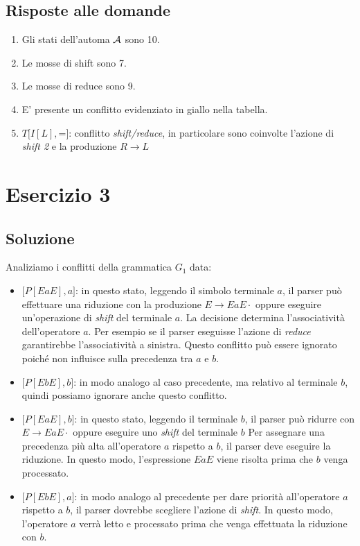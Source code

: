 \documentclass[11pt]{article}
\begin{document}
\subsection{Risposte alle domande}

\begin{enumerate}
  \item Gli stati dell'automa $\cal A$ sono 10.
  \item Le mosse di shift sono 7.
  \item Le mosse di reduce sono 9.
  \item E' presente un conflitto evidenziato in giallo nella tabella.
  \item $T\big[I[L], $=$\big]$: conflitto \textit{shift/reduce}, in particolare 
  sono coinvolte l'azione di \textit{shift 2} e la produzione $R\rightarrow L$
\end{enumerate}


\section{Esercizio 3}
\subsection{Soluzione}
Analiziamo i conflitti della grammatica $G_1$ data:
\begin{itemize}
  \item $\big[P[EaE], a\big]$: in questo stato, leggendo il simbolo terminale $a$, il parser può
effettuare una riduzione con la produzione $E \rightarrow EaE\cdot$ oppure eseguire 
un'operazione di \textit{shift} del terminale $a$.
La decisione determina l'associatività dell'operatore $a$. Per esempio se il parser 
eseguisse l'azione di \textit{reduce} garantirebbe l'associatività a sinistra. Questo 
conflitto può essere ignorato poiché non influisce sulla precedenza tra $a$ e $b$.
  
\item $\big[P[EbE], b\big]$: in modo analogo al caso precedente, ma relativo al terminale $b$, quindi possiamo ignorare anche questo conflitto.
    
\item $\big[P[EaE], b\big]$: in questo stato, leggendo il terminale $b$, il parser può ridurre 
con $E \rightarrow EaE\cdot$ oppure eseguire uno \textit{shift} del terminale $b$
Per assegnare una precedenza più alta all'operatore $a$ rispetto a $b$, il parser deve 
eseguire la riduzione. In questo modo, l'espressione $EaE$ viene risolta prima che 
$b$ venga processato.
  
\item $\big[P[EbE], a\big]$: in modo analogo al precedente per dare priorità 
all'operatore $a$ rispetto a $b$, il parser dovrebbe scegliere l'azione di \textit{shift}. 
In questo modo, l'operatore $a$ verrà letto e processato prima che venga effettuata la riduzione con $b$.
\end{itemize}
\end{document}
